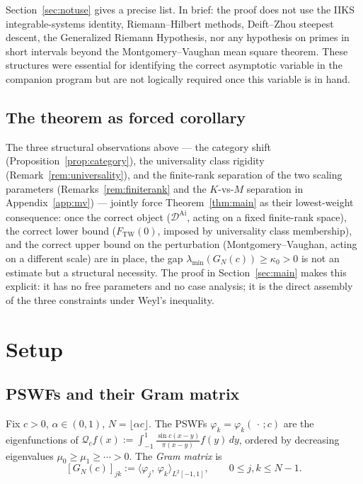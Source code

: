 \documentclass[12pt,a4paper]{amsart}
\theoremstyle{definition}
\newcommand{\DAi}{\mathcal{D}^{\mathrm{Ai}}}
\newcommand{\GN}{G_N(c)}
\newcommand{\ip}[2]{\langle #1,\, #2 \rangle}
\newcommand{\FTW}{F_{\mathrm{TW}}(0)}
\begin{document}
Section~\ref{sec:notuse} gives a precise list.
In brief: the proof does not use the IIKS integrable-systems identity,
Riemann--Hilbert methods, Deift--Zhou steepest descent, the Generalized
Riemann Hypothesis, nor any hypothesis on primes in short intervals
beyond the Montgomery--Vaughan mean square theorem.
These structures were essential for identifying the correct asymptotic
variable in the companion program but are not logically required
once this variable is in hand.

\subsection{The theorem as forced corollary}\label{ssec:forced}


The three structural observations above --- the category shift
(Proposition~\ref{prop:category}), the universality class rigidity
(Remark~\ref{rem:universality}), and the finite-rank separation of
the two scaling parameters (Remarks~\ref{rem:finiterank} and
the $K$-vs-$M$ separation in Appendix~\ref{app:mv}) --- jointly force
Theorem~\ref{thm:main} as their lowest-weight consequence:
once the correct object ($\DAi$, acting on a fixed finite-rank space),
the correct lower bound ($\FTW$, imposed by universality class membership),
and the correct upper bound on the perturbation (Montgomery--Vaughan,
acting on a different scale) are in place,
the gap $\lambda_{\min}(\GN) \ge \kappa_0 > 0$ is not an estimate
but a structural necessity.
The proof in Section~\ref{sec:main} makes this explicit:
it has no free parameters and no case analysis;
it is the direct assembly of the three constraints under Weyl's inequality.

\section{Setup}
\label{sec:setup}

\subsection{PSWFs and their Gram matrix}

Fix $c > 0$, $\alpha \in (0,1)$, $N = \lfloor\alpha c\rfloor$.
The PSWFs $\varphi_k = \varphi_k(\,\cdot\,;c)$ are the eigenfunctions of
$\mathcal{Q}_c f(x) := \int_{-1}^{1} \frac{\sin c(x-y)}{\pi(x-y)} f(y)\,dy$,
ordered by decreasing eigenvalues $\mu_0 \ge \mu_1 \ge \cdots > 0$.
The \emph{Gram matrix} is
\begin{equation}\label{eq:gram}
  [\GN]_{jk} := \ip{\varphi_j}{\varphi_k}_{L^2[-1,1]},
  \qquad 0 \le j,k \le N-1.
\end{equation}
\end{document}
